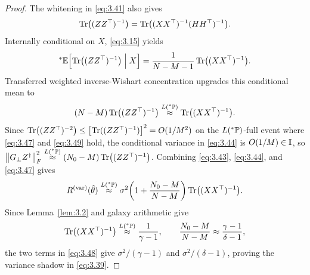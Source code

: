 \begin{proof}
The whitening in \eqref{eq:3.41} also gives
\begin{equation}\label{eq:3.45}
\operatorname{Tr}\bigl((Z Z^\top)^{-1}\bigr) = \operatorname{Tr}\bigl((X X^\top)^{-1}(H H^\top)^{-1}\bigr).
\end{equation}
Internally conditional on $X$, \eqref{eq:3.15} yields
\begin{equation}\label{eq:3.46}
{}^*\mathbb{E}\Bigl[\operatorname{Tr}\bigl((Z Z^\top)^{-1}\bigr) \;\Big|\; X\Bigr] = \frac{1}{N - M - 1}\operatorname{Tr}\bigl((X X^\top)^{-1}\bigr).
\end{equation}
Transferred weighted inverse-Wishart concentration upgrades this conditional mean to
\begin{equation}\label{eq:3.47}
(N - M)\operatorname{Tr}\bigl((Z Z^\top)^{-1}\bigr) \stackrel{L({}^*\mathbb{P})}{\approx} \operatorname{Tr}\bigl((X X^\top)^{-1}\bigr).
\end{equation}
Since $\operatorname{Tr}\bigl((Z Z^\top)^{-2}\bigr) \le \bigl[\operatorname{Tr}((Z Z^\top)^{-1})\bigr]^2 = O(1/M^2)$ on the $L({}^*\mathbb{P})$-full event where \eqref{eq:3.47} and \eqref{eq:3.49} hold, the conditional variance in \eqref{eq:3.44} is $O(1/M) \in \mathbb{I}$, so $\left\lVert G_\perp Z^\dagger \right\rVert_F^2 \stackrel{L({}^*\mathbb{P})}{\approx} (N_0 - M)\operatorname{Tr}\bigl((Z Z^\top)^{-1}\bigr)$. Combining \eqref{eq:3.43}, \eqref{eq:3.44}, and \eqref{eq:3.47} gives
\begin{equation}\label{eq:3.48}
R^{(\mathrm{var})}(\hat{\theta}) \stackrel{L({}^*\mathbb{P})}{\approx} \sigma^2\!\left(1 + \frac{N_0 - M}{N - M}\right)\operatorname{Tr}\bigl((X X^\top)^{-1}\bigr).
\end{equation}
Since Lemma~\ref{lem:3.2} and galaxy arithmetic give
\begin{equation}\label{eq:3.49}
\operatorname{Tr}\bigl((X X^\top)^{-1}\bigr) \stackrel{L({}^*\mathbb{P})}{\approx} \frac{1}{\gamma - 1}, \qquad \frac{N_0 - M}{N - M} \approx \frac{\gamma - 1}{\delta - 1},
\end{equation}
the two terms in \eqref{eq:3.48} give $\sigma^2 / (\gamma - 1)$ and $\sigma^2 / (\delta - 1)$, proving the variance shadow in \eqref{eq:3.39}.


\end{proof}
